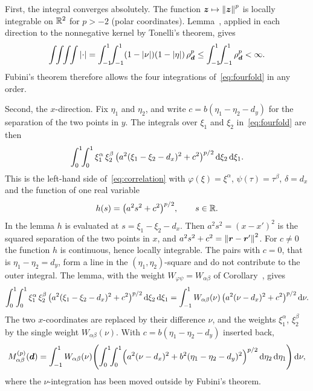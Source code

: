 First, the integral converges absolutely. The function $\vb*{z}\mapsto\left\| \vb*{z} \right\|^p$ is locally integrable on $\mathbb{R}^2$ for $p>-2$
(polar coordinates). Lemma~, applied in each direction to the nonnegative kernel by Tonelli's
theorem, gives
\begin{equation}
    \int\!\!\int\!\!\int\!\!\int \ABS{\cdot}
    = \int_{-1}^1\!\!\int_{-1}^1(1-\ABS{\nu})(1-\ABS{\eta})\,\rho_{\offs}^p
    \le \int_{-1}^1\!\!\int_{-1}^1\rho_{\offs}^p < \infty .
\end{equation}
Fubini's theorem therefore allows the four integrations of~\eqref{eq:fourfold} in any order.

Second, the $x$-direction. Fix $\eta_1$ and $\eta_2$, and write $c=b(\eta_1-\eta_2-d_y)$ for the separation of the two
points in $y$. The integrals over $\xi_1$ and $\xi_2$ in~\eqref{eq:fourfold} are then
\begin{equation}
    \int_0^1\!\!\int_0^1 \xi_1^{\alpha}\,\xi_2^{\beta}\,\bigl(a^2(\xi_1-\xi_2-d_x)^2+c^2\bigr)^{p/2}\,\mathrm{d}\xi_2\,\mathrm{d}\xi_1 .
\end{equation}
This is the left-hand side of~\eqref{eq:correlation} with $\varphi(\xi)=\xi^\alpha$, $\psi(\tau)=\tau^\beta$,
$\delta=d_x$ and the function of one real variable
\begin{equation}
    h(s)=\bigl(a^2s^2+c^2\bigr)^{p/2}, \qquad s\in\mathbb{R} .
\end{equation}
In the lemma $h$ is evaluated at $s=\xi_1-\xi_2-d_x$. Then $a^2s^2=(x-x')^2$ is the squared separation of the two
points in $x$, and $a^2s^2+c^2=\left\| \vb*{r}-\vb*{r}' \right\|^2$.
For $c\ne0$ the function $h$ is continuous, hence locally integrable. The pairs with $c=0$, that is
$\eta_1-\eta_2=d_y$, form a line in the $(\eta_1,\eta_2)$-square and do not contribute to the outer integral. The
lemma, with the weight $W_{\varphi\psi}=W_{\alpha\beta}$ of Corollary~, gives
\begin{equation}
    \int_0^1\!\!\int_0^1 \xi_1^{\alpha}\,\xi_2^{\beta}\,\bigl(a^2(\xi_1-\xi_2-d_x)^2+c^2\bigr)^{p/2}\,\mathrm{d}\xi_2\,\mathrm{d}\xi_1
    = \int_{-1}^{1} W_{\alpha\beta}(\nu)\,\bigl(a^2(\nu-d_x)^2+c^2\bigr)^{p/2}\,\mathrm{d}\nu .
\end{equation}
The two $x$-coordinates are replaced by their difference $\nu$, and the weights $\xi_1^\alpha$, $\xi_2^\beta$ by the
single weight $W_{\alpha\beta}(\nu)$. With $c=b(\eta_1-\eta_2-d_y)$ inserted back,
\begin{equation}
    M^{(p)}_{\alpha\beta}(\vb*{d}) = \int_{-1}^{1} W_{\alpha\beta}(\nu)\Biggl(\int_0^1\!\!\int_0^1
    \Bigl(a^2(\nu-d_x)^2+b^2(\eta_1-\eta_2-d_y)^2\Bigr)^{p/2}\,\mathrm{d}\eta_2\,\mathrm{d}\eta_1\Biggr)\,\mathrm{d}\nu ,
\end{equation}
where the $\nu$-integration has been moved outside by Fubini's theorem.

